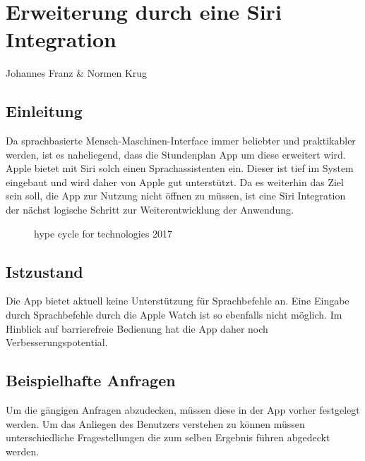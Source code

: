 \chapter{Erweiterung durch eine Siri Integration}
Johannes Franz \& Normen Krug

\section{Einleitung}
Da sprachbasierte Mensch-Maschinen-Interface immer beliebter und praktikabler werden, ist es naheliegend, dass die Stundenplan App um diese erweitert wird. Apple bietet mit Siri solch einen Sprachassistenten ein. Dieser ist tief im System eingebaut und wird daher von Apple gut unterstützt. 
Da es weiterhin das Ziel sein soll, die App zur Nutzung nicht öffnen zu müssen, ist eine Siri Integration der nächst logische Schritt zur Weiterentwicklung der Anwendung.

\begin{figure}[ht]
	\centering
	\caption{hype cycle for technologies 2017}
	\label{hype}
\end{figure}


\section{Istzustand}
Die App bietet aktuell keine Unterstützung für Sprachbefehle an. Eine Eingabe durch Sprachbefehle durch die Apple Watch ist so ebenfalls nicht möglich. Im Hinblick auf barrierefreie Bedienung hat die App daher noch Verbesserungspotential.

\section{Beispielhafte Anfragen}
Um die gängigen Anfragen abzudecken, müssen diese in der App vorher festgelegt werden. Um das Anliegen des Benutzers verstehen zu können müssen unterschiedliche Fragestellungen die zum selben Ergebnis führen abgedeckt werden.


